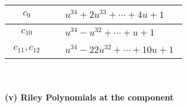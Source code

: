 \documentclass[1p]{elsarticle_modified}
\theoremstyle{definition}
\begin{document}
\begin{tabular}{m{50pt}|m{274pt}}
\hline $$\begin{aligned}c_{9}\end{aligned}$$&$\begin{aligned}
&u^{34}+2 u^{33}+\cdots+4 u+1
\end{aligned}$\\
\hline $$\begin{aligned}c_{10}\end{aligned}$$&$\begin{aligned}
&u^{34}- u^{32}+\cdots+u+1
\end{aligned}$\\
\hline $$\begin{aligned}c_{11},c_{12}\end{aligned}$$&$\begin{aligned}
&u^{34}-22 u^{32}+\cdots+10 u+1
\end{aligned}$\\
\hline
\end{tabular}\\~\\
\newpage\renewcommand{\arraystretch}{1}
\flushleft \textbf{(v) Riley Polynomials at the component}\newline \\
\end{document}
